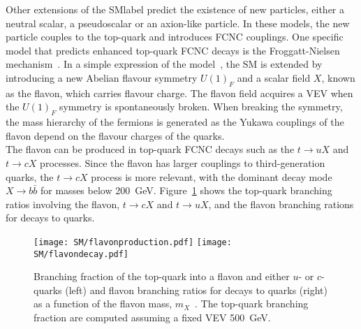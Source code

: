 Other extensions of the \acrshort{SMlabel} predict the existence of new particles, either a neutral scalar, a pseudoscalar or an axion-like particle. In these models, the new particle couples to the top-quark and introduces FCNC couplings. One specific model that predicts enhanced top-quark FCNC decays is the Froggatt-Nielsen mechanism~\cite{FROGGATT1979277,Banerjee2018}. In a simple expression of the model~\cite{Bauer_2016}, the SM is extended by introducing a new Abelian flavour symmetry $U(1)_F$ and a scalar field $X$, known as the flavon, which carries flavour charge. The flavon field acquires a \acrshort{VEV} when the $U(1)_F$ symmetry is spontaneously broken. When breaking the symmetry, the mass hierarchy of the fermions is generated as the Yukawa couplings of the flavon depend on the flavour charges of the quarks.\\

The flavon can be produced in top-quark FCNC decays such as the $t\to uX$ and $t\to cX$ processes. Since the flavon has larger couplings to third-generation quarks, the $t\to cX$ process is more relevant, with the dominant decay mode $X\to b\bar{b}$ for masses below 200~GeV. Figure~\ref{BSM:flavon} shows the top-quark branching ratios involving the flavon, $t\to cX$ and $t\to uX$, and the flavon branching rations for decays to quarks.

\begin{figure}[htbp]
    \RawFloats
    \begin{center}
        \texttt{[image: SM/flavonproduction.pdf]}
        \texttt{[image: SM/flavondecay.pdf]}
        \caption{
        Branching fraction of the top-quark into a flavon and either $u$- or $c$-quarks (left) and flavon branching ratios for decays to quarks (right) as a function of the flavon mass, $m_X$~\cite{Bauer_2016}. The top-quark branching fraction are computed assuming a fixed \acrshort{VEV} 500~GeV.
    }
    \label{BSM:flavon}
    \end{center}
\end{figure}







